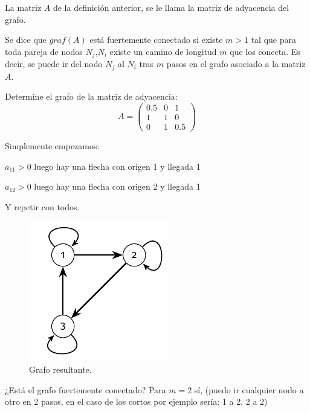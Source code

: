 \begin{ndef}
	La matriz $A$ de la definición anterior, se le llama la matriz de adyacencia del grafo.
\end{ndef}

\begin{ndef}
	Se dice que $graf(A)$ está fuertemente conectado si existe $m>1$ tal que para toda pareja de nodos $N_{j}$,$N_{i}$ existe un camino de longitud $m$ que los conecta. Es decir, se puede ir del nodo $N_{j}$ al $N_{i}$ tras $m$ pasos en el grafo asociado a la matriz $A$.
\end{ndef}

\begin{ejemplo}
Determine el grafo de la matriz de adyacencia:
$$A=
\begin{pmatrix}
0.5 & 0 & 1 \\
1 & 1 & 0 \\
0 & 1 & 0.5
\end{pmatrix}
$$

Simplemente empezamos:

$a_{11}>0$ luego hay una flecha con origen 1 y llegada 1

$a_{12}>0$ luego hay una flecha con origen 2 y llegada 1

Y repetir con todos.
\begin{figure}[H]
	\caption{Grafo resultante.}
	\centering \includegraphics{img/grafo_1.pdf}
\end{figure}

¿Está el grafo fuertemente conectado? Para $m=2$ sí, (puedo ir cualquier nodo a otro en 2 pasos, en el caso de los cortos por ejemplo sería: 1 a 2, 2 a 2)
\end{ejemplo}

